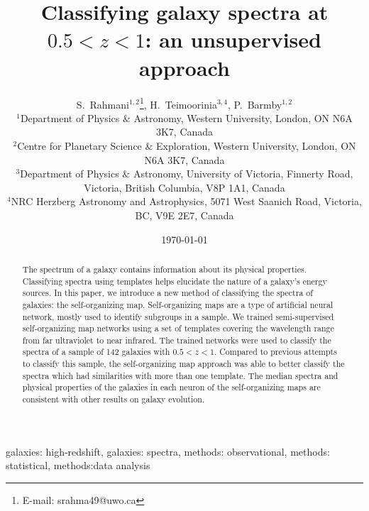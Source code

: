 \documentclass[useAMS,usenatbib]{mn2e}
\begin{document}

\title[Classifying high-$z$ galaxy spectra]{Classifying galaxy spectra at $0.5<z<1$: an unsupervised approach}
\date{\today}
\author[S.~Rahmani, H.~Teimoorinia and P.~Barmby]{S.~Rahmani$^{1,2}$\thanks{E-mail:
srahma49@uwo.ca}, H.~Teimoorinia$^{3,4}$, P.~Barmby$^{1,2}$\\
$^{1}$Department of Physics $\&$ Astronomy, Western University, London, ON N6A 3K7, Canada\\
$^{2}$Centre for Planetary Science \& Exploration, Western University, London, ON N6A 3K7, Canada\\
$^{3}$Department of Physics $\&$ Astronomy, University of Victoria, Finnerty Road, Victoria, British Columbia, V8P 1A1, Canada\\
$^{4}$NRC Herzberg Astronomy and Astrophysics, 5071 West Saanich Road, Victoria, BC, V9E 2E7, Canada }
\maketitle


\begin{abstract}
    The spectrum of a galaxy contains information about its physical properties.
    Classifying spectra using templates helps elucidate the nature of a galaxy's energy sources.
    In this paper, we introduce a new method of classifying the spectra
    of galaxies: the self-organizing map.
    Self-organizing maps are a type of artificial neural network, mostly used to identify subgroups in a sample.
    We trained semi-supervised self-organizing map networks using a set of
    templates covering the wavelength range from far ultraviolet to near infrared. 
    The trained networks were used to classify the spectra of a sample of 142 galaxies with $0.5 < z < 1$.
    Compared to previous attempts to classify this sample, the
    self-organizing map approach was able to better classify the spectra which had similarities with more than one template.
    The median spectra and physical properties of the galaxies in each neuron of the self-organizing maps are consistent with other results on galaxy evolution.

\end{abstract}
\begin{keywords} 
 galaxies: high-redshift, 
 galaxies: spectra, 
 methods: observational, 
 methods: statistical, 
 methods:data analysis
\end{keywords}
\end{document}
